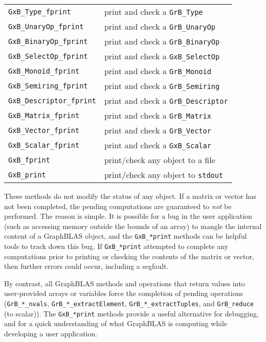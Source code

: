 \documentclass[12pt]{article}
\begin{document}
\vspace{0.2in}
{\footnotesize
\begin{tabular}{ll}
\hline
\verb'GxB_Type_fprint'        & print and check a \verb'GrB_Type' \\
\verb'GxB_UnaryOp_fprint'     & print and check a \verb'GrB_UnaryOp' \\
\verb'GxB_BinaryOp_fprint'    & print and check a \verb'GrB_BinaryOp' \\
\verb'GxB_SelectOp_fprint'    & print and check a \verb'GxB_SelectOp' \\
\verb'GxB_Monoid_fprint'      & print and check a \verb'GrB_Monoid' \\
\verb'GxB_Semiring_fprint'    & print and check a \verb'GrB_Semiring' \\
\verb'GxB_Descriptor_fprint'  & print and check a \verb'GrB_Descriptor' \\
\verb'GxB_Matrix_fprint'      & print and check a \verb'GrB_Matrix' \\
\verb'GxB_Vector_fprint'      & print and check a \verb'GrB_Vector' \\
\verb'GxB_Scalar_fprint'      & print and check a \verb'GxB_Scalar' \\
\hline
\verb'GxB_fprint'             & print/check any object to a file \\
\verb'GxB_print'              & print/check any object to \verb'stdout' \\
\hline
\end{tabular}
}
\vspace{0.2in}

These methods do not modify the status of any object.  If a matrix or vector
has not been completed, the pending computations are guaranteed to {\em not} be
performed. The reason is simple.  It is possible for a bug in the user
application (such as accessing memory outside the bounds of an array) to mangle
the internal content of a GraphBLAS object, and the \verb'GxB_*print' methods
can be helpful tools to track down this bug.  If \verb'GxB_*print' attempted to
complete any computations prior to printing or checking the contents of the
matrix or vector, then further errors could occur, including a segfault.

By contrast, all GraphBLAS methods and operations that return values into
user-provided arrays or variables force the completion of pending operations
(\verb'GrB_*_nvals', \verb'GrB_*_extractElement', \verb'GrB_*_extractTuples',
and \verb'GrB_reduce' (to scalar)).  The \verb'GxB_*print' methods provide
a useful alternative for debugging, and for a quick understanding of what
GraphBLAS is computing while developing a user application.
\end{document}
